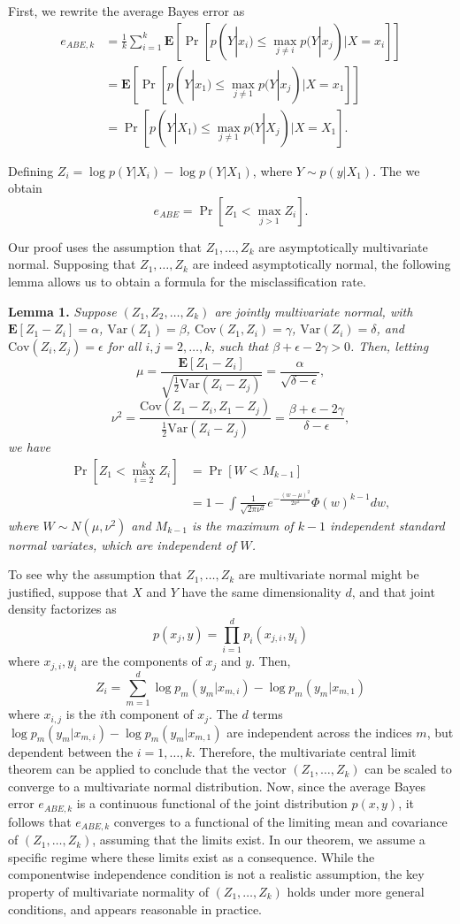 \documentclass{article}
\newcommand{\E}{\textbf{E}}
\newcommand{\Cov}{\text{Cov}}
\newcommand{\Var}{\text{Var}}
\begin{document}
First, we rewrite the average Bayes error as
\begin{align}
e_{ABE, k} &= \frac{1}{k}\sum_{i=1}^k \E[\Pr[p(Y|x_i) \leq \max_{j \neq i} p(Y|x_j)| X = x_i]]
\\&= \E[\Pr[p(Y|x_1) \leq \max_{j \neq 1} p(Y|x_j)| X = x_1]]
\\&= \Pr[p(Y|X_1) \leq \max_{j \neq 1} p(Y|X_j)| X = X_1].
\end{align}

Defining $Z_i = \log p(Y|X_i) - \log p(Y|X_1)$, where $Y \sim p(y|X_1)$.
The we obtain
\[
e_{ABE} = \Pr[Z_1 < \max_{j > 1} Z_i].
\]

Our proof uses the assumption that $Z_1,\hdots, Z_k$ are asymptotically multivariate normal.
Supposing that $Z_1,\hdots, Z_k$ are indeed asymptotically normal, the following lemma
allows us to obtain a formula for the misclassification rate.

\textbf{Lemma 1. }
\emph{
Suppose $(Z_1, Z_2, \hdots, Z_k)$ are jointly multivariate normal, with 
$\E[Z_1 - Z_i]= \alpha$, 
$\Var(Z_1) = \beta$, 
$\Cov(Z_1, Z_i) = \gamma$, 
$\Var(Z_i)= \delta$, and $\Cov(Z_i, Z_j) = \epsilon$ for all $i, j = 2, \hdots,
k$, such that $\beta + \epsilon - 2\gamma > 0$.  Then, letting
\[
\mu = \frac{\E[Z_1 - Z_i]}{\sqrt{\frac{1}{2}\Var(Z_i - Z_j)}} = \frac{\alpha}{\sqrt{\delta - \epsilon}},
\]
\[
\nu^2 = \frac{\Cov(Z_1 -Z_i, Z_1 - Z_j)}{\frac{1}{2}\Var(Z_i - Z_j)} = \frac{\beta + \epsilon - 2\gamma}{\delta - \epsilon},
\]
we have
\begin{align*}
\Pr[Z_1 < \max_{i=2}^k Z_i] &= \Pr[W < M_{k-1}]
\\&= 1 - \int \frac{1}{\sqrt{2\pi\nu^2}} e^{-\frac{(w-\mu)^2}{2\nu^2}} \Phi(w)^{k-1} dw,
\end{align*}
where $W \sim N(\mu, \nu^2)$ and $M_{k-1}$ is the maximum of $k-1$
independent standard normal variates, which are independent of $W$.
}

To see why the assumption that $Z_1,\hdots, Z_k$ are multivariate normal might be justified, suppose that $X$ and $Y$ have the same dimensionality $d$, and that
joint density factorizes as
\[
p(x_j, y) = \prod_{i=1}^d p_i(x_{j, i}, y_i)
\]
where $x_{j, i}, y_i$ are the components of $x_j$ and $y$.
Then,
\[
Z_i = \sum_{m=1}^d \log p_m(y_m | x_{m, i}) - \log p_m(y_m | x_{m, 1})
\]
where $x_{i, j}$ is the $i$th component of $x_j$.
The $d$ terms $\log p_m(y_m | x_{m, i}) - \log p_m(y_m | x_{m, 1})$ are independent across the indices $m$,
but dependent between the $i = 1,\hdots, k$.
Therefore, the multivariate central limit theorem can be applied to conclude that the vector
$(Z_1,\hdots, Z_k)$ can be scaled to converge to a multivariate normal distribution.
Now, since the average Bayes error $e_{ABE,k}$ is a continuous functional of the joint distribution $p(x, y)$,
it follows that $e_{ABE,k}$ converges to a functional of the limiting mean and covariance of $(Z_1,\hdots, Z_k)$, assuming
that the limits exist.
In our theorem, we assume a specific regime where these limits exist as a consequence.
While the componentwise independence condition is not a realistic assumption,
the key property of multivariate normality of $(Z_1,\hdots, Z_k)$ holds under more general conditions, and appears reasonable in practice.
\end{document}
